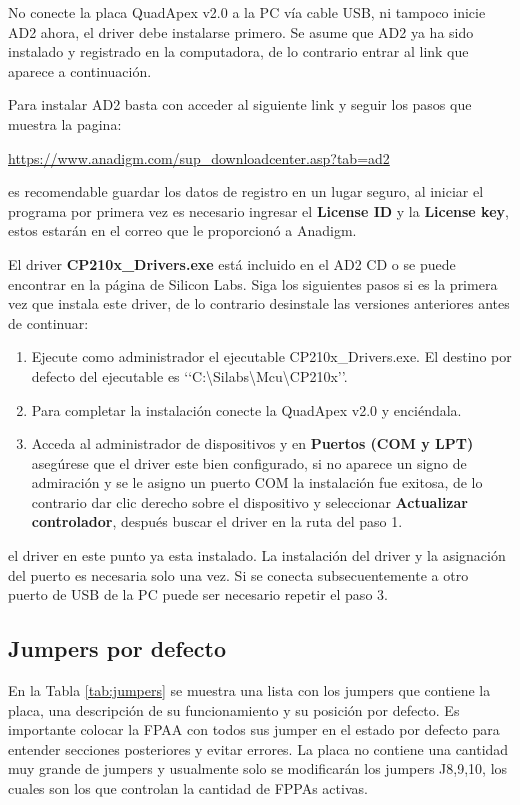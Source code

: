 	No conecte la placa QuadApex v2.0 a la PC vía cable USB,  ni tampoco inicie AD2 ahora, el driver debe instalarse primero. Se asume que AD2 ya ha sido instalado y registrado en la computadora, de lo contrario entrar al link que aparece a continuación.

	Para instalar AD2 basta con acceder al siguiente link y seguir los pasos que muestra la pagina:

	\begin{center}
		\url{https://www.anadigm.com/sup_downloadcenter.asp?tab=ad2}
	\end{center}
	es recomendable guardar los datos de registro en un lugar seguro, al iniciar el programa por primera vez es necesario ingresar el \textbf{License ID} y la \textbf{License key}, estos estarán en el correo que le proporcionó a Anadigm. 

	El driver \textbf{CP210x\_{}Drivers.exe} está incluido en el AD2 CD o se puede encontrar en la página de Silicon Labs. Siga los siguientes pasos si es la primera vez que instala este driver, de lo contrario desinstale las versiones anteriores antes de continuar:

	\begin{enumerate}
		\item Ejecute como administrador el ejecutable  CP210x\_{}Drivers.exe. El destino por defecto del ejecutable es ‘‘C:\textbackslash{}Silabs\textbackslash{}Mcu\textbackslash{}CP210x’’.
		\item Para completar la instalación conecte la QuadApex v2.0 y enciéndala.
		\item Acceda al administrador de dispositivos y en \textbf{Puertos (COM y LPT)} asegúrese que el driver este bien configurado, si no aparece un signo de admiración y se le asigno un puerto COM  la instalación fue exitosa, de lo contrario dar clic derecho sobre el dispositivo y seleccionar \textbf{Actualizar controlador}, después buscar el  driver en la ruta del paso 1.
	\end{enumerate}
	el driver en este punto ya esta instalado. La instalación del driver y la asignación del puerto es necesaria solo una vez. Si se conecta subsecuentemente a otro puerto de USB de la PC puede ser necesario repetir el paso 3.

	
		\subsection{Jumpers por defecto}
	
	En la Tabla \ref{tab:jumpers} se muestra una lista con los jumpers que contiene la placa, una descripción de su funcionamiento y su posición por defecto. Es importante colocar la FPAA con todos sus jumper en el estado por defecto para entender secciones posteriores y evitar errores. La placa no contiene una cantidad muy grande de jumpers y usualmente solo se modificarán los jumpers J8,9,10, los cuales son los que controlan la cantidad de FPPAs activas.
	
